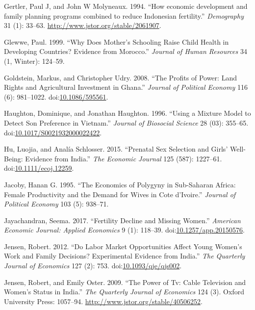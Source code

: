 \documentclass[]{article}
\begin{document}
\hypertarget{ref-Gertler1994}{}
Gertler, Paul J, and John W Molyneaux. 1994. ``How economic development and family planning programs combined to reduce Indonesian fertility.'' \emph{Demography} 31 (1): 33--63. \url{http://www.jstor.org/stable/2061907}.

\hypertarget{ref-Glewwe1999}{}
Glewwe, Paul. 1999. ``Why Does Mother's Schooling Raise Child Health in Developing Countries? Evidence from Morocco.'' \emph{Journal of Human Resources} 34 (1, Winter): 124--59.

\hypertarget{ref-Goldstein2008}{}
Goldstein, Markus, and Christopher Udry. 2008. ``The Profits of Power: Land Rights and Agricultural Investment in Ghana.'' \emph{Journal of Political Economy} 116 (6): 981--1022. doi:\href{https://doi.org/10.1086/595561}{10.1086/595561}.

\hypertarget{ref-Haughton1996}{}
Haughton, Dominique, and Jonathan Haughton. 1996. ``Using a Mixture Model to Detect Son Preference in Vietnam.'' \emph{Journal of Biosocial Science} 28 (03): 355--65. doi:\href{https://doi.org/10.1017/S0021932000022422}{10.1017/S0021932000022422}.

\hypertarget{ref-Hu2015}{}
Hu, Luojia, and Analía Schlosser. 2015. ``Prenatal Sex Selection and Girls' Well-Being: Evidence from India.'' \emph{The Economic Journal} 125 (587): 1227--61. doi:\href{https://doi.org/10.1111/ecoj.12259}{10.1111/ecoj.12259}.

\hypertarget{ref-jacoby95}{}
Jacoby, Hanan G. 1995. ``The Economics of Polygyny in Sub-Saharan Africa: Female Productivity and the Demand for Wives in Cote d'Ivoire.'' \emph{Journal of Political Economy} 103 (5): 938--71.

\hypertarget{ref-Jayachandran2017}{}
Jayachandran, Seema. 2017. ``Fertility Decline and Missing Women.'' \emph{American Economic Journal: Applied Economics} 9 (1): 118--39. doi:\href{https://doi.org/10.1257/app.20150576}{10.1257/app.20150576}.

\hypertarget{ref-Jensen2012}{}
Jensen, Robert. 2012. ``Do Labor Market Opportunities Affect Young Women's Work and Family Decisions? Experimental Evidence from India.'' \emph{The Quarterly Journal of Economics} 127 (2): 753. doi:\href{https://doi.org/10.1093/qje/qjs002}{10.1093/qje/qjs002}.

\hypertarget{ref-Jensen2009}{}
Jensen, Robert, and Emily Oster. 2009. ``The Power of Tv: Cable Television and Women's Status in India.'' \emph{The Quarterly Journal of Economics} 124 (3). Oxford University Press: 1057--94. \url{http://www.jstor.org/stable/40506252}.
\end{document}
